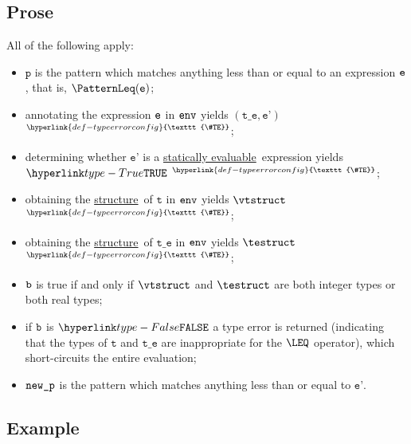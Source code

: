 \documentclass{book}
\newcommand\TypeErrorConfig[0]{\hyperlink{def-typeerrorconfig}{\texttt{\#TE}}}
\newcommand\ProseOrTypeError[0]{\hyperlink{def-proseortypeerror}{$^{\TypeErrorConfig}$}}
\newcommand\structure[0]{\hyperlink{def-structure}{structure}}
\newcommand\staticallyevaluable[0]{\hyperlink{def-staticallyevaluable}{statically evaluable}}
\newcommand\vp[0]{\texttt{p}}
\newcommand\vt[0]{\texttt{t}}
\newcommand\vte[0]{\texttt{t\_e}}
\newcommand\vep[0]{\texttt{e'}}
\begin{document}
\subsection{Prose}
All of the following apply:
\begin{itemize}
\item $\vp$ is the pattern which matches anything less than or equal to an expression $\texttt{e}$,
that is, $\PatternLeq(\ve)$;
\item annotating the expression $\texttt{e}$ in $\texttt{env}$ yields $(\vte, \vep)$ \ProseOrTypeError;
\item determining whether $\vep$ is a \staticallyevaluable\ expression yields $\True$ \ProseOrTypeError;
\item obtaining the \structure\ of $\vt$ in $\texttt{env}$ yields $\vtstruct$ \ProseOrTypeError;
\item obtaining the \structure\ of $\vte$ in $\texttt{env}$ yields $\testruct$ \ProseOrTypeError;
\item $\texttt{b}$ is true if and only if $\vtstruct$ and $\testruct$ are both integer types or both real types;
\item if $\texttt{b}$ is $\False$ a type error is returned (indicating that the types of $\vt$ and $\vte$
      are inappropriate for the $\LEQ$ operator),
which short-circuits the entire evaluation;
\item $\texttt{new\_p}$ is the pattern which matches anything less than or equal to $\vep$.
\end{itemize}

\subsection{Example}

\end{document}
